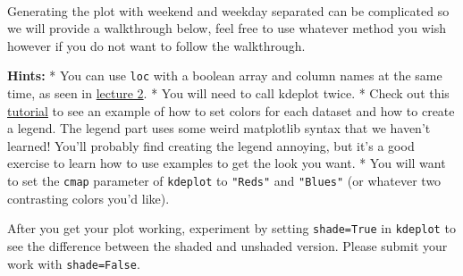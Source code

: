 \documentclass[11pt]{article}
\begin{document}
    \begin{center}
    \end{center}
    { \hspace*{\fill} \\}
    
    Generating the plot with weekend and weekday separated can be
complicated so we will provide a walkthrough below, feel free to use
whatever method you wish however if you do not want to follow the
walkthrough.

\textbf{Hints:} * You can use \texttt{loc} with a boolean array and
column names at the same time, as seen in
\href{https://docs.google.com/presentation/d/1qMRtloXaccvJLfyZckn-UpuG0Prb1XtJHLPWQX2OMSo/edit\#slide=id.g4114e65f62_0_404}{lecture
2}. * You will need to call kdeplot twice. * Check out this
\href{http://financeandpython.com/SeabornDataVisualization/8/3.html}{tutorial}
to see an example of how to set colors for each dataset and how to
create a legend. The legend part uses some weird matplotlib syntax that
we haven't learned! You'll probably find creating the legend annoying,
but it's a good exercise to learn how to use examples to get the look
you want. * You will want to set the \texttt{cmap} parameter of
\texttt{kdeplot} to \texttt{"Reds"} and \texttt{"Blues"} (or whatever
two contrasting colors you'd like).

After you get your plot working, experiment by setting
\texttt{shade=True} in \texttt{kdeplot} to see the difference between
the shaded and unshaded version. Please submit your work with
\texttt{shade=False}.
\end{document}
